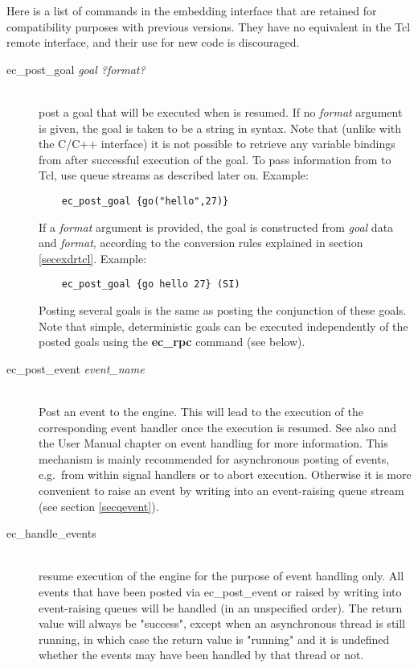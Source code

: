 Here is a list of commands in the embedding interface that are retained for
compatibility purposes with previous versions. They have no equivalent in
the Tcl remote interface, and their use for new code is discouraged.

\begin{description}
\item[ec_post_goal {\it goal ?format?}]\ \\
        post a goal that will be executed when {\eclipse} is resumed.
	If no {\it format} argument is given, the goal is taken to be a string
	in {\eclipse} syntax.  Note that (unlike with the C/C++
	interface) it is not possible to retrieve any variable
	bindings from {\eclipse} after successful execution of the
	goal.
	To pass information from {\eclipse} to Tcl, use queue streams
	as described later on.  Example:
	\begin{verbatim}
	ec_post_goal {go("hello",27)}
	\end{verbatim}

	If a {\it format} argument is provided, the {\eclipse} goal is
	constructed from {\it goal} data and {\it format}, according to
	the conversion rules explained in section \ref{secexdrtcl}. Example:
	\begin{verbatim}
	ec_post_goal {go hello 27} (SI)
	\end{verbatim}

	Posting several goals is the same as posting the conjunction
	of these goals.  Note that simple, deterministic goals can be
	executed independently of the posted goals using the {\bf
	ec_rpc} command (see below).

\item[ec_post_event {\it event_name}]\ \\
        Post an event to the {\eclipse} engine. This will lead to the
        execution of the corresponding event handler once the {\eclipse}
        execution is resumed. See also  and the User Manual
        chapter on event handling for more information.
        This mechanism is mainly recommended for asynchronous posting
        of events, e.g.\ from within signal handlers or to abort execution.
        Otherwise it is more convenient to raise an event by writing into
        an event-raising queue stream (see section \ref{secqevent}).

\item[ec_handle_events]\ \\
        resume execution of the {\eclipse} engine for the purpose of
	event handling only. All events that have been posted via
	ec_post_event or raised by writing into event-raising queues
	will be handled (in an unspecified order).
	The return value will always be "success", except when an
	asynchronous {\eclipse} thread is still running, in which case
	the return value is "running" and it is undefined whether the
	events may have been handled by that thread or not.


\end{description}
